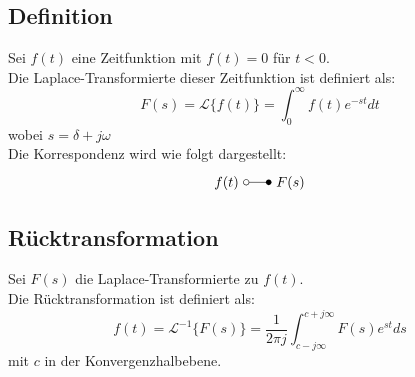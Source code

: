 \documentclass[10pt,a4paper]{article}
\begin{document}
\subsection{Definition}
Sei $f(t)$ eine Zeitfunktion mit $f(t) = 0$ für $t < 0$. \\
Die Laplace-Transformierte dieser Zeitfunktion ist definiert als:
$$
	F(s) = \mathcal{L}\{f(t)\} = \int_0^{∞} f(t) e^{-st} dt
$$
wobei
$s = \delta + j \omega$ \\

Die Korrespondenz wird wie folgt dargestellt:
$$
	f(t) ~\laplace ~F(s)
$$

\subsection{Rücktransformation}
Sei $F(s)$ die Laplace-Transformierte zu $f(t)$. \\
Die Rücktransformation ist definiert als:
$$
	f(t) = \mathcal{L}^{-1}\{F(s)\} = \frac 1 {2\pi j} \int_{c - j ∞}^{c + j∞} F(s) e^{st} ds
$$
mit $c$ in der Konvergenzhalbebene.
\end{document}

